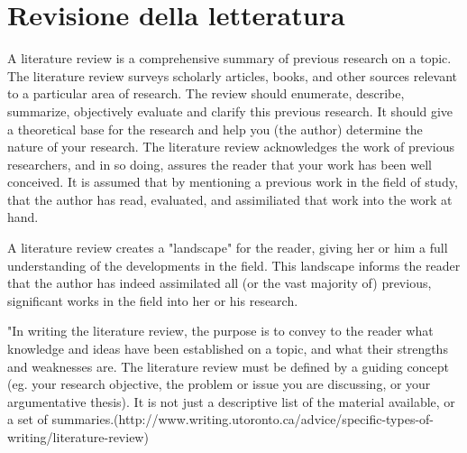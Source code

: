 \chapter{Revisione della letteratura}
\begin{commento}
A literature review is a comprehensive summary of previous research on a topic. The literature review surveys scholarly articles, books, and other sources relevant to a particular area of research. The review should enumerate, describe, summarize, objectively evaluate and clarify this previous research.  It should give a theoretical base for the research and help you (the author) determine the nature of your research.  The literature review acknowledges the work of previous researchers, and in so doing, assures the reader that your work has been well conceived.  It is assumed that by mentioning a previous work in the field of study, that the author has read, evaluated, and assimiliated that work into the work at hand.

A literature review creates a "landscape" for the reader, giving her or him a full understanding of the developments in the field.  This landscape informs the reader that the author has indeed assimilated all (or the vast majority of) previous, significant works in the field into her or his research. 

"In writing the literature review, the purpose is to convey to the reader what knowledge and ideas have been established on a topic, and what their strengths and weaknesses are. The literature review must be defined by a guiding concept (eg. your research objective, the problem or issue you are discussing, or your argumentative thesis). It is not just a descriptive list of the material available, or a set of summaries.(http://www.writing.utoronto.ca/advice/specific-types-of-writing/literature-review)

\end{commento}
